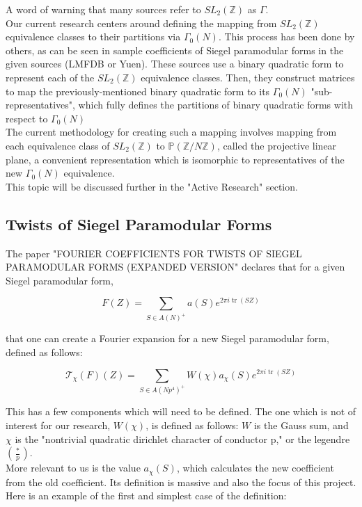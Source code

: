 \documentclass[11pt, oneside]{amsart}
\begin{document}
A word of warning that many sources refer to $SL_{2}(\mathbb{Z})$ as  $\Gamma$.\\
Our current research centers around defining the mapping from $SL_{2}(\mathbb{Z})$ equivalence classes to their partitions via $\Gamma_{0}(N)$. This process has been done by others, as can be seen in sample coefficients of Siegel paramodular forms in the given sources (LMFDB or Yuen). These sources use a binary quadratic form to represent each of the $SL_{2}(\mathbb{Z})$ equivalence classes. Then, they construct matrices to map the previously-mentioned binary quadratic form to its $\Gamma_{0}(N)$ "sub-representatives", which fully defines the partitions of binary quadratic forms with respect to $\Gamma_{0}(N)$\\
The current methodology for creating such a mapping involves mapping from each equivalence class of $SL_{2}(\mathbb{Z})$ to $\mathbb{P}(\mathbb{Z}/N\mathbb{Z})$, called the projective linear plane, a convenient representation which is isomorphic to representatives of the new $\Gamma_{0}(N)$ equivalence.\\
This topic will be discussed further in the "Active Research" section.

\subsection{Twists of Siegel Paramodular Forms}
The paper "FOURIER COEFFICIENTS FOR TWISTS OF SIEGEL PARAMODULAR FORMS (EXPANDED VERSION" declares that for a given Siegel paramodular form, 

$$F(Z)=\sum_{S \in A(N)^{+}} a(S) e^{2 \pi i \operatorname{tr}(S Z)}$$

that one can create a Fourier expansion for a new Siegel paramodular form, defined as follows:

$$\mathcal{T}_{\chi}(F)(Z)=\sum_{S \in A\left(N p^{4}\right)^{+}} W(\chi) a_{\chi}(S) e^{2 \pi i \operatorname{tr}(S Z)}$$

This has a few components which will need to be defined. The one which is not of interest for our research, $W(\chi)$, is defined as follows: $W$ is the Gauss sum, and $\chi$ is the "nontrivial quadratic dirichlet character of conductor p," or the legendre $(\frac{*}{p})$.\\

More relevant to us is the value $a_{\chi}(S)$, which calculates the new coefficient from the old coefficient. Its definition is massive and also the focus of this project. Here is an example of the first and simplest case of the definition:
\end{document}
